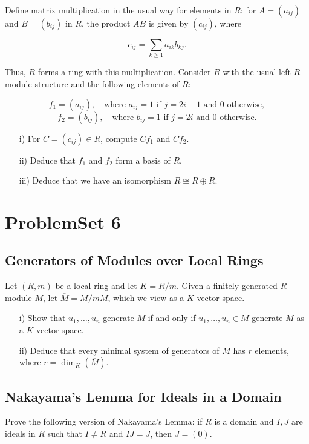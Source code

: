 \documentclass[lang=cn,11pt]{template}
\begin{document}
Define matrix multiplication in the usual way for elements in \( R \): for \( A = (a_{ij}) \) and \( B = (b_{ij}) \) in \( R \), the product \( AB \) is given by \( (c_{ij}) \), where

\[
c_{ij} = \sum_{k \geq 1} a_{ik}b_{kj}.
\]

Thus, \( R \) forms a ring with this multiplication. Consider \( R \) with the usual left \( R \)-module structure and the following elements of \( R \):

\[
f_1 = (a_{ij}), \quad \text{where } a_{ij} = 1 \text{ if } j = 2i - 1 \text{ and } 0 \text{ otherwise},
\]
\[
f_2 = (b_{ij}), \quad \text{where } b_{ij} = 1 \text{ if } j = 2i \text{ and } 0 \text{ otherwise}.
\]

\begin{itemize}
    \item[i)] For \( C = (c_{ij}) \in R \), compute \( Cf_1 \) and \( Cf_2 \).
    \item[ii)] Deduce that \( f_1 \) and \( f_2 \) form a basis of \( R \).
    \item[iii)] Deduce that we have an isomorphism \( R \cong R \oplus R \).
\end{itemize}









\chapter{ProblemSet 6}

\section{Generators of Modules over Local Rings}
Let \( (R, m) \) be a local ring and let \( K = R/m \). Given a finitely generated \( R \)-module \( M \), let \( \overline{M} = M/mM \), which we view as a \( K \)-vector space.
\begin{itemize}
    \item[i)] Show that \( u_1, \dots, u_n \) generate \( M \) if and only if \( u_1, \dots, u_n \in \overline{M} \) generate \( \overline{M} \) as a \( K \)-vector space.
    \item[ii)] Deduce that every minimal system of generators of \( M \) has \( r \) elements, where \( r = \dim_K(\overline{M}) \).
\end{itemize}

\section{Nakayama's Lemma for Ideals in a Domain}
Prove the following version of Nakayama’s Lemma: if \( R \) is a domain and \( I, J \) are ideals in \( R \) such that \( I \neq R \) and \( IJ = J \), then \( J = (0) \).
\end{document}
